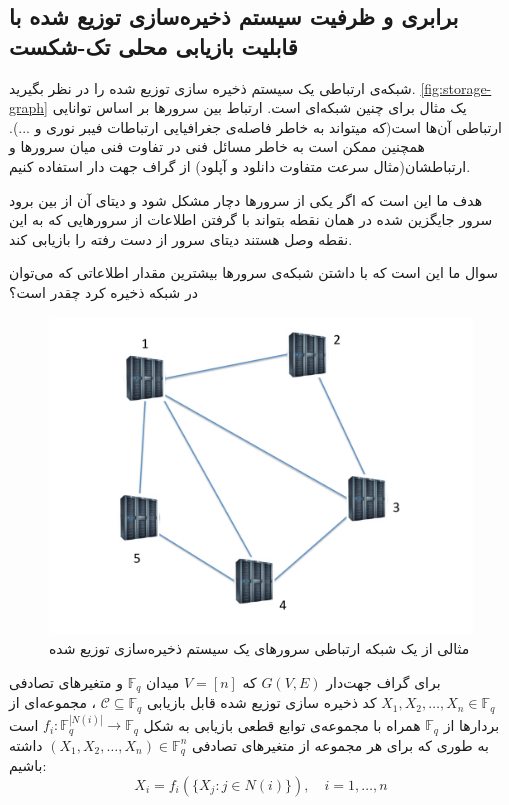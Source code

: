  \subsection{
 برابری 
 \icod
  و ظرفیت سیستم ذخیره‌سازی توزیع شده با قابلیت بازیابی محلی تک-شکست
 }
 \label{subsec:arya}
 شبکه‌ی ارتباطی یک سیستم ذخیره سازی توزیع شده را در نظر بگیرید.
 \autoref{fig:storage-graph}
 یک مثال برای چنین شبکه‌ای است. ارتباط بین سرورها بر اساس توانایی ارتباطی آن‌ها است(که میتواند به خاطر فاصله‌ی جغرافیایی ارتباطات فیبر نوری و ...). همچنین ممکن است به خاطر مسائل فنی در تفاوت فنی میان سرورها و ارتباطشان(مثال سرعت متفاوت دانلود و آپلود) از گراف جهت دار استفاده کنیم.
 
 هدف ما این است که اگر یکی از سرورها دچار مشکل شود و دیتای آن از بین برود سرور جایگزین شده در همان نقطه بتواند با گرفتن اطلاعات از سرورهایی که به این نقطه وصل هستند دیتای سرور از دست رفته را بازیابی کند.
 
 سوال ما این است که با داشتن شبکه‌ی سرورها بیشترین مقدار اطلاعاتی که می‌توان در شبکه ذخیره کرد چقدر است؟
\begin{figure}[H]
	\centering
	\includegraphics[width=0.5\linewidth]{figs/chapter6/storage-graph}
	\caption{
		مثالی از یک شبکه ارتباطی سرورهای یک سیستم ذخیره‌سازی توزیع شده
		\cite{arya}
		}
	\label{fig:storage-graph}
\end{figure}

\begin{definition}
	برای گراف جهت‌دار
	$G(V, E)$
	که
	$V = [n]$
	میدان
	$\mathbb{F}_{q}$
	و متغیرهای تصادفی
	$X_1, X_2, \ldots, X_n \in \mathbb{F}_{q}$
		کد ذخیره سازی توزیع شده قابل بازیابی 
		$\mathcal{C} \subseteq \mathbb{F}_{q}$
		،  مجموعه‌ای از بردار‌ها از
		$\mathbb{F}_{q}$
		همراه با مجموعه‌ی توابع قطعی بازیابی به شکل
		$f_i: \mathbb{F}_q^{|N(i)|} \to \mathbb{F}_q$
		است به طوری که برای هر مجموعه از متغیرهای تصادفی 
		$(X_1, X_2,\dots,X_n) \in \mathbb{F}_q^n$
		داشته باشیم:
		$$X_i = f_i(\{X_j: j \in N(i)\}), \quad i = 1,\dots,n$$
\end{definition}


